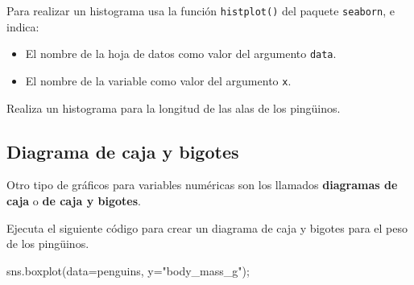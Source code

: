 \documentclass[
  a4paper,
  noprof,
  12pt,
  notoc,
  nosols,
  nobib]{mnye}
\newenvironment{Shaded}{\begin{snugshade}}{\end{snugshade}}
\newcommand{\NormalTok}[1]{\textcolor[rgb]{0.00,0.23,0.31}{#1}}
\newcommand{\OperatorTok}[1]{\textcolor[rgb]{0.37,0.37,0.37}{#1}}
\newcommand{\StringTok}[1]{\textcolor[rgb]{0.13,0.47,0.30}{#1}}
\providecommand{\tightlist}{%
  \setlength{\itemsep}{0pt}\setlength{\parskip}{0pt}}\usepackage{longtable,booktabs,array}
\renewenvironment{exercise}[1][]{
            \if\relax\detokenize{#1}\relax
                \ex
            \else
                \ex[note={#1}]
            \fi
        }{\endex}
\theoremstyle{definition}
\newtheorem{exercise}{Ejercicio}[section]
\theoremstyle{remark}
\begin{document}
\begin{tcolorbox}[enhanced jigsaw, bottomrule=.15mm, colframe=quarto-callout-note-color-frame, toprule=.15mm, leftrule=.75mm, breakable, left=2mm, arc=.35mm, rightrule=.15mm, colback=white, opacityback=0]
\begin{minipage}[t]{5.5mm}
\textcolor{quarto-callout-note-color}{\faInfo}
\end{minipage}%
\begin{minipage}[t]{\textwidth - 5.5mm}

Para realizar un histograma usa la función \texttt{histplot()} del
paquete \texttt{seaborn}, e indica:

\begin{itemize}
\tightlist
\item
  El nombre de la hoja de datos como valor del argumento \texttt{data}.
\item
  El nombre de la variable como valor del argumento \texttt{x}.
\end{itemize}

\end{minipage}%
\end{tcolorbox}

\begin{exercise}[]%
\protect\hypertarget{exr-1numerical-histplot}{}\label{exr-1numerical-histplot}%
Realiza un histograma para la longitud de las alas de los pingüinos.

\end{exercise}

\subsection{Diagrama de caja y bigotes}\label{sec-1numerical-boxplot}

Otro tipo de gráficos para variables numéricas son los llamados
\textbf{diagramas de caja} o \textbf{de caja y bigotes}.

Ejecuta el siguiente código para crear un diagrama de caja y bigotes
para el peso de los pingüinos.

\begin{Shaded}
\begin{Highlighting}[]
\NormalTok{sns.boxplot(data}\OperatorTok{=}\NormalTok{penguins, y}\OperatorTok{=}\StringTok{"body\_mass\_g"}\NormalTok{)}\OperatorTok{;}
\end{Highlighting}
\end{Shaded}
\end{document}
